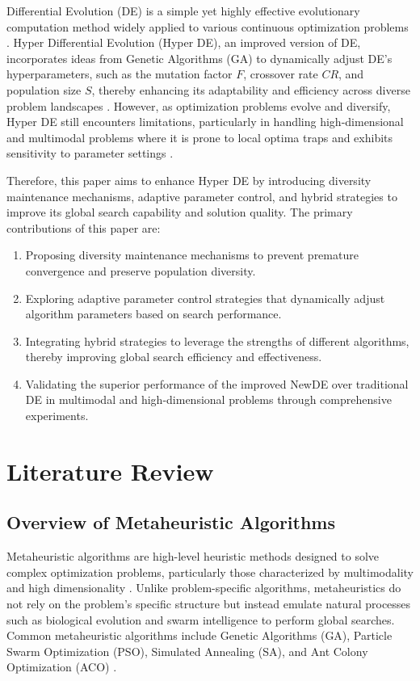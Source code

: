 \documentclass[conference]{IEEEtran}
\begin{document}
Differential Evolution (DE) is a simple yet highly effective evolutionary computation method widely applied to various continuous optimization problems \cite{storn1997differential}. Hyper Differential Evolution (Hyper DE), an improved version of DE, incorporates ideas from Genetic Algorithms (GA) to dynamically adjust DE's hyperparameters, such as the mutation factor $F$, crossover rate $CR$, and population size $S$, thereby enhancing its adaptability and efficiency across diverse problem landscapes \cite{burke2013hyper, grobler2010alternative}. However, as optimization problems evolve and diversify, Hyper DE still encounters limitations, particularly in handling high-dimensional and multimodal problems where it is prone to local optima traps and exhibits sensitivity to parameter settings \cite{grobler2010alternative}.

Therefore, this paper aims to enhance Hyper DE by introducing diversity maintenance mechanisms, adaptive parameter control, and hybrid strategies to improve its global search capability and solution quality. The primary contributions of this paper are:

\begin{enumerate}
    \item Proposing diversity maintenance mechanisms to prevent premature convergence and preserve population diversity.
    \item Exploring adaptive parameter control strategies that dynamically adjust algorithm parameters based on search performance.
    \item Integrating hybrid strategies to leverage the strengths of different algorithms, thereby improving global search efficiency and effectiveness.
    \item Validating the superior performance of the improved NewDE over traditional DE in multimodal and high-dimensional problems through comprehensive experiments.
\end{enumerate}

\section{Literature Review}

\subsection{Overview of Metaheuristic Algorithms}

Metaheuristic algorithms are high-level heuristic methods designed to solve complex optimization problems, particularly those characterized by multimodality and high dimensionality \cite{burke2013hyper, grobler2010alternative}. Unlike problem-specific algorithms, metaheuristics do not rely on the problem's specific structure but instead emulate natural processes such as biological evolution and swarm intelligence to perform global searches. Common metaheuristic algorithms include Genetic Algorithms (GA), Particle Swarm Optimization (PSO), Simulated Annealing (SA), and Ant Colony Optimization (ACO) \cite{burke2013hyper, storn1997differential, eiben1999parameter, grobler2010alternative}.
\end{document}
